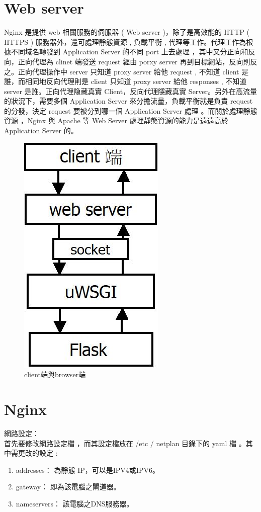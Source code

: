 \documentclass[14pt,a4paper]{report}  %
\begin{document}
\section{Web server}
 Nginx 是提供 web 相關服務的伺服器 ( Web server )，除了是高效能的 HTTP ( HTTPS ) 服務器外，還可處理靜態資源 , 負載平衡 , 代理等工作。代理工作為根據不同域名轉發到 Application Server 的不同 port 上去處理 ，其中又分正向和反向，正向代理為 clinet 端發送 request 經由 porxy server 再到目標網站，反向則反之。正向代理操作中 server 只知道 proxy server  給他 request , 不知道 client 是誰，而相同地反向代理則是 client 只知道 proxy server 給他 responses , 不知道 server 是誰。正向代理隐藏真實 Client，反向代理隱藏真實 Server。另外在高流量的狀況下，需要多個 Application Server 來分擔流量，負載平衡就是負責 request 的分發，決定 request 要被分到哪一個 Application Server 處理 。而關於處理靜態資源 ，Nginx 與 Apache 等 Web Server 處理靜態資源的能力是遠遠高於 Application Server 的。\\
 \begin{figure}[hbt!]
\begin{center}
\includegraphics[scale=0.74]{clientToflask}
\caption{\Large client端與browser端}\label{client端與browser端}
\end{center}
\end{figure}

\section{Nginx}
 網路設定：\\
 首先要修改網路設定檔 ，而其設定檔放在 /etc / netplan 目錄下的 yaml 檔 。其中需更改的設定 :
\begin{enumerate}
\item addresses： 為靜態 IP，可以是IPV4或IPV6。
\item gateway： 即為該電腦之閘道器。
\item nameservers： 該電腦之DNS服務器。
\end{enumerate}
\end{document}
